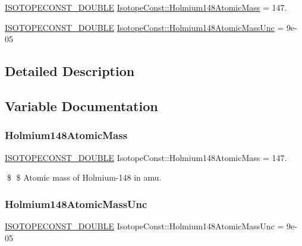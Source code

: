 \begin{DoxyCompactItemize}
\item 
\mbox{\hyperlink{group___isotope_const-_macros_ga8f45a7272ce02c0b4c65c44636ed719a}{I\+S\+O\+T\+O\+P\+E\+C\+O\+N\+S\+T\+\_\+\+D\+O\+U\+B\+LE}} \mbox{\hyperlink{group___isotope_const-_holmium-_ho148_gaf717c22666dd2f3470ecaa53d96227cd}{Isotope\+Const\+::\+Holmium148\+Atomic\+Mass}} = 147.
\item 
\mbox{\hyperlink{group___isotope_const-_macros_ga8f45a7272ce02c0b4c65c44636ed719a}{I\+S\+O\+T\+O\+P\+E\+C\+O\+N\+S\+T\+\_\+\+D\+O\+U\+B\+LE}} \mbox{\hyperlink{group___isotope_const-_holmium-_ho148_ga90d01a684f7ab5e48afebc5253467840}{Isotope\+Const\+::\+Holmium148\+Atomic\+Mass\+Unc}} = 9e-\/05
\end{DoxyCompactItemize}


\subsection{Detailed Description}


\subsection{Variable Documentation}
\mbox{\label{group___isotope_const-_holmium-_ho148_gaf717c22666dd2f3470ecaa53d96227cd}} 
\subsubsection{\texorpdfstring{Holmium148\+Atomic\+Mass}{Holmium148AtomicMass}}
{\footnotesize\ttfamily \mbox{\hyperlink{group___isotope_const-_macros_ga8f45a7272ce02c0b4c65c44636ed719a}{I\+S\+O\+T\+O\+P\+E\+C\+O\+N\+S\+T\+\_\+\+D\+O\+U\+B\+LE}} Isotope\+Const\+::\+Holmium148\+Atomic\+Mass = 147.}

\$ \$ Atomic mass of Holmium-\/148 in amu. \mbox{\label{group___isotope_const-_holmium-_ho148_ga90d01a684f7ab5e48afebc5253467840}} 
\subsubsection{\texorpdfstring{Holmium148\+Atomic\+Mass\+Unc}{Holmium148AtomicMassUnc}}
{\footnotesize\ttfamily \mbox{\hyperlink{group___isotope_const-_macros_ga8f45a7272ce02c0b4c65c44636ed719a}{I\+S\+O\+T\+O\+P\+E\+C\+O\+N\+S\+T\+\_\+\+D\+O\+U\+B\+LE}} Isotope\+Const\+::\+Holmium148\+Atomic\+Mass\+Unc = 9e-\/05}

